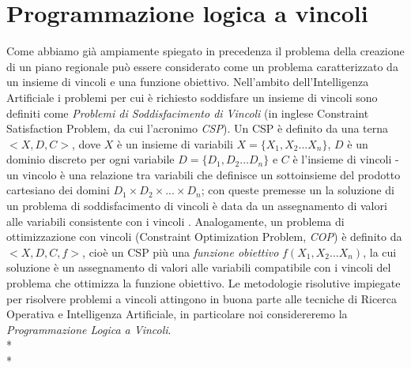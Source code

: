 \section[CLP]{\nohyphens{Programmazione logica a vincoli}}
Come abbiamo già ampiamente spiegato in precedenza il problema della creazione di un piano regionale può essere considerato come un problema caratterizzato da un insieme di vincoli e una funzione obiettivo. Nell'ambito dell'Intelligenza Artificiale i problemi per cui è richiesto soddisfare un insieme di vincoli sono definiti come \emph{Problemi di Soddisfacimento di Vincoli} (in inglese Constraint Satisfaction Problem, da cui l'acronimo \emph{CSP}). Un CSP è definito da una terna $<X,D,C>$, dove $X$ è un insieme di variabili $X=\{X_1,X_2...X_n\}$, $D$ è un dominio discreto per ogni variabile $D=\{D_1,D_2...D_n\}$ e $C$ è l'insieme di vincoli - un vincolo è una relazione tra variabili che definisce un sottoinsieme del prodotto cartesiano dei domini $D_1 \times D_2 \times ... \times D_n$; con queste premesse un la soluzione di un problema di soddisfacimento di vincoli è data da un assegnamento di valori alle variabili consistente con i vincoli \cite{cspFoundations}. Analogamente, un problema di ottimizzazione con vincoli (Constraint Optimization Problem, \emph{COP}) è definito da $<X,D,C,f>$, cioè un CSP più una \emph{funzione obiettivo} $f(X_1,X_2...X_n)$, la cui soluzione è un assegnamento di valori alle variabili compatibile con i vincoli del problema che ottimizza la funzione obiettivo. Le metodologie risolutive impiegate per risolvere problemi a vincoli attingono in buona parte alle tecniche di Ricerca Operativa e Intelligenza Artificiale, in particolare noi considereremo la \emph{Programmazione Logica a Vincoli}.\\*\\*
